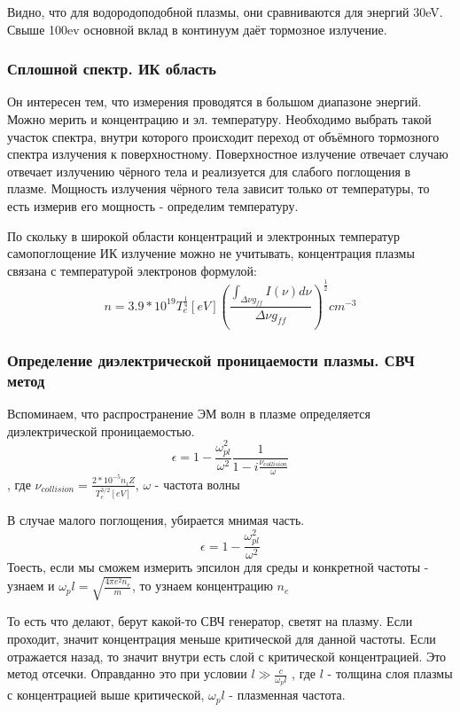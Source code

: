 \documentclass[10pt, a4paper]{article}
\begin{document}
Видно, что для водородоподобной плазмы, они сравниваются для энергий 30eV. Свыше 100ev основной вклад в континуум даёт тормозное излучение.

\subsubsection{Сплошной спектр. ИК область}

Он интересен тем, что измерения проводятся в большом диапазоне энергий. Можно мерить и концентрацию и эл. температуру.
Необходимо выбрать такой участок спектра, внутри которого происходит переход от объёмного тормозного спектра излучения к поверхностному.
Поверхностное излучение отвечает случаю отвечает излучению чёрного тела и реализуется для слабого поглощения в плазме. Мощность излучения чёрного тела зависит только от температуры, то есть измерив его мощность - определим температуру.

По скольку в широкой области концентраций и электронных температур самопоглощение ИК излучение можно не учитывать, концентрация плазмы связана с температурой электронов формулой:
\begin{equation}
	n=3.9*10^{19} T_e^{\frac{1}{4}}[eV] (\frac{\int_{\Delta \nu g_{ff}} I(\nu) d\nu}{\Delta \nu g_{ff}})^{\frac{1}{2}}   cm^{-3}
\end{equation}

\subsubsection{Определение диэлектрической проницаемости плазмы. СВЧ метод}

Вспоминаем, что распространение ЭМ волн в плазме определяется диэлектрической проницаемостью.
\begin{equation}
	\epsilon = 1- \frac{\omega_{pl}^{2}}{\omega^{2}} \frac{1}{1-i \frac{\nu_{collision}}{\omega}}
\end{equation} 
, где $\nu_{collision}=\frac{2*10^{-5} n_i Z}{T_e^{3/2}[eV]}$, $\omega$ - частота волны

В случае малого поглощения, убирается мнимая часть.
\begin{equation}
	\epsilon = 1- \frac{\omega_{pl}^{2}}{\omega^{2}} 
\end{equation} 
Тоесть, если мы сможем измерить эпсилон для среды и конкретной частоты - узнаем и $\omega_pl = \sqrt{\frac{4 \pi e^{2} n_e}{m}}$, то узнаем концентрацию $n_e$

То есть что делают, берут какой-то СВЧ генератор, светят на плазму. Если проходит, значит концентрация меньше критической для данной частоты. Если отражается назад, то значит внутри есть слой с критической концентрацией. Это метод отсечки.
Оправданно это при условии $l \gg \frac{c}{\omega_pl}$
, где $l$ - толщина слоя плазмы с концентрацией выше критической, $\omega_pl$ - плазменная частота.
\end{document}
